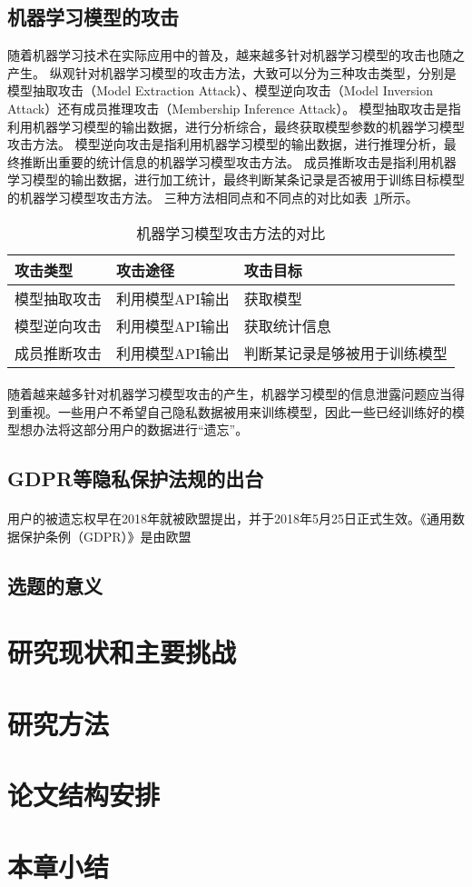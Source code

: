 \subsection{机器学习模型的攻击}
随着机器学习技术在实际应用中的普及，越来越多针对机器学习模型的攻击也随之产生。
纵观针对机器学习模型的攻击方法，大致可以分为三种攻击类型，分别是模型抽取攻击（Model Extraction Attack）、模型逆向攻击（Model Inversion Attack）还有成员推理攻击（Membership Inference Attack）。
模型抽取攻击是指利用机器学习模型的输出数据，进行分析综合，最终获取模型参数的机器学习模型攻击方法。
模型逆向攻击是指利用机器学习模型的输出数据，进行推理分析，最终推断出重要的统计信息的机器学习模型攻击方法。
成员推断攻击是指利用机器学习模型的输出数据，进行加工统计，最终判断某条记录是否被用于训练目标模型的机器学习模型攻击方法。
三种方法相同点和不同点的对比如表~\ref{tab:model-attack-difference}所示。
\begin{table}
    \centering
    \caption{机器学习模型攻击方法的对比}
    \begin{tabular}{lll}
      \toprule
      攻击类型  & 攻击途径 & 攻击目标  \\
      \midrule
      模型抽取攻击   & 利用模型API输出 & 获取模型 \\
      模型逆向攻击   & 利用模型API输出 & 获取统计信息                    \\
      成员推断攻击 & 利用模型API输出  & 判断某记录是够被用于训练模型  \\
      \bottomrule
    \end{tabular}
    \label{tab:model-attack-difference}
\end{table}
\paragraph{}随着越来越多针对机器学习模型攻击的产生，机器学习模型的信息泄露问题应当得到重视。一些用户不希望自己隐私数据被用来训练模型，因此一些已经训练好的模型想办法将这部分用户的数据进行“遗忘”。
\subsection{GDPR等隐私保护法规的出台}
\paragraph{}用户的被遗忘权早在2018年就被欧盟提出，并于2018年5月25日正式生效。《通用数据保护条例（GDPR）》是由欧盟
\subsection{选题的意义}

\section{研究现状和主要挑战}

\section{研究方法}

\section{论文结构安排}

\section{本章小结}

